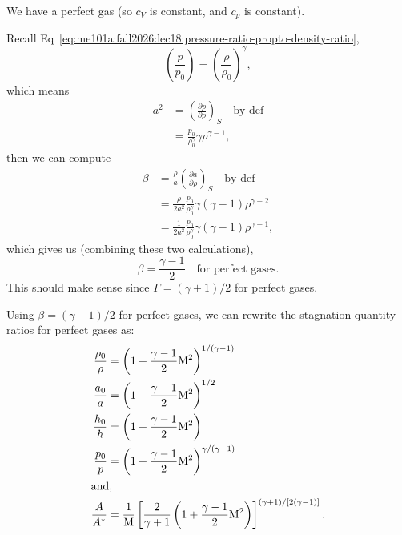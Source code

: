 \begin{assume}
We have a perfect gas (so $c_{V}$ is constant, and $c_{p}$ is constant).
\end{assume}

\begin{node}
Recall Eq~\eqref{eq:me101a:fall2026:lec18:pressure-ratio-propto-density-ratio},
\begin{equation}
\left(\frac{p}{p_{0}}\right)=\left(\frac{\rho}{\rho_{0}}\right)^{\gamma},
\end{equation}
which means
\begin{subequations}
  \begin{align}
a^{2} &= \left(\frac{\partial p}{\partial\rho}\right)_{S}\quad\mbox{by def}\\
&= \frac{p_{0}}{\rho_{0}^{\gamma}}\gamma\rho^{\gamma-1},
  \end{align}
\end{subequations}
then we can compute
\begin{subequations}
  \begin{align}
\beta&=\frac{\rho}{a}\left(\frac{\partial a}{\partial\rho}\right)_{S}\quad\mbox{by def}\\
&=\frac{\rho}{2a^{2}}\frac{p_{0}}{\rho_{0}^{\gamma}}\gamma(\gamma-1)\rho^{\gamma-2}\\
&=\frac{1}{2a^{2}}\frac{p_{0}}{\rho_{0}^{\gamma}}\gamma(\gamma-1)\rho^{\gamma-1},
  \end{align}
\end{subequations}
which gives us (combining these two calculations),
\begin{equation}
\boxed{\beta=\frac{\gamma-1}{2}\quad\mbox{for perfect gases}.}
\end{equation}
This should make sense since $\Gamma=(\gamma+1)/2$ for perfect gases.
\end{node}

\begin{node}
Using $\beta=(\gamma-1)/2$ for perfect gases, we can rewrite the
stagnation quantity ratios for perfect gases as:
\begin{subequations}
  \begin{align}
\frac{\rho_{0}}{\rho} &= \left(1+\frac{\gamma-1}{2}\mathrm{M}^{2}\right)^{1/(\gamma-1)}\\
\frac{a_{0}}{a} &= \left(1+\frac{\gamma-1}{2}\mathrm{M}^{2}\right)^{1/2}\\
\frac{h_{0}}{h} &= \left(1+\frac{\gamma-1}{2}\mathrm{M}^{2}\right)\\
\frac{p_{0}}{p} &= \left(1+\frac{\gamma-1}{2}\mathrm{M}^{2}\right)^{\gamma/(\gamma-1)}\\
\intertext{and,}
\frac{A}{A^{*}} &= \frac{1}{\mathrm{M}}\left[\frac{2}{\gamma+1}\left(1+\frac{\gamma-1}{2}\mathrm{M}^{2}\right)\right]^{(\gamma+1)/[2(\gamma-1)]}.
  \end{align}
\end{subequations}
\end{node}

